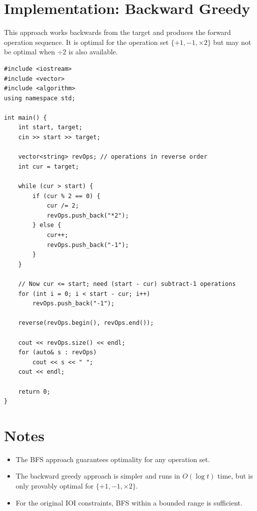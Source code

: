 \documentclass[11pt,a4paper]{article}
\begin{document}
\section{Implementation: Backward Greedy}

This approach works backwards from the target and produces the forward
operation sequence. It is optimal for the operation set $\{+1, -1, \times 2\}$
but may not be optimal when $\div 2$ is also available.

\begin{lstlisting}
#include <iostream>
#include <vector>
#include <algorithm>
using namespace std;

int main() {
    int start, target;
    cin >> start >> target;

    vector<string> revOps; // operations in reverse order
    int cur = target;

    while (cur > start) {
        if (cur % 2 == 0) {
            cur /= 2;
            revOps.push_back("*2");
        } else {
            cur++;
            revOps.push_back("-1");
        }
    }

    // Now cur <= start; need (start - cur) subtract-1 operations
    for (int i = 0; i < start - cur; i++)
        revOps.push_back("-1");

    reverse(revOps.begin(), revOps.end());

    cout << revOps.size() << endl;
    for (auto& s : revOps)
        cout << s << " ";
    cout << endl;

    return 0;
}
\end{lstlisting}

\section{Notes}

\begin{itemize}
  \item The BFS approach guarantees optimality for any operation set.
  \item The backward greedy approach is simpler and runs in $O(\log t)$
    time, but is only provably optimal for $\{+1, -1, \times 2\}$.
  \item For the original IOI constraints, BFS within a bounded range is
    sufficient.
\end{itemize}
\end{document}
